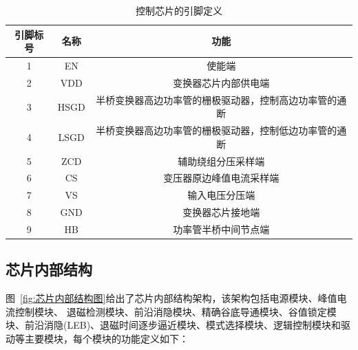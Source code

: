 \begin{table}[htbp]
    \caption{控制芯片的引脚定义}
    \label{tab:控制芯片的引脚定义}
    \centering
    \belowrulesep=0pt  %
    \aboverulesep=0pt  %
        \begin{tabular}{|c|c|c|}
            \toprule
            引脚标号 & 名称 & 功能  \\
            \midrule
            1 & EN   & 使能端                                              \\  \midrule
            2 & VDD  & 变换器芯片内部供电端                                 \\  \midrule
            3 & HSGD & 半桥变换器高边功率管的栅极驱动器，控制高边功率管的通断  \\\midrule  
            4 & LSGD & 半桥变换器高边功率管的栅极驱动器，控制低边功率管的通断  \\\midrule  
            5 & ZCD  & 辅助绕组分压采样端                                    \\  \midrule
            6 & CS   & 变压器原边峰值电流采样端                               \\ \midrule
            7 & VS   & 输入电压分压端                                        \\  \midrule
            8 & GND  & 变换器芯片接地端                                      \\  \midrule
            9 & HB   & 功率管半桥中间节点端                                   \\ 
              
            \bottomrule
        \end{tabular}
\end{table}

\subsection{芯片内部结构}
图~\ref{fig:芯片内部结构图}给出了芯片内部结构架构，该架构包括电源模块、峰值电流控制模块、 退磁检测模块、前沿消隐模块、精确谷底导通模块、谷值锁定模块、前沿消隐(LEB)、退磁时间逐步逼近模块、模式选择模块、逻辑控制模块和驱动等主要模块，每个模块的功能定义如下：

